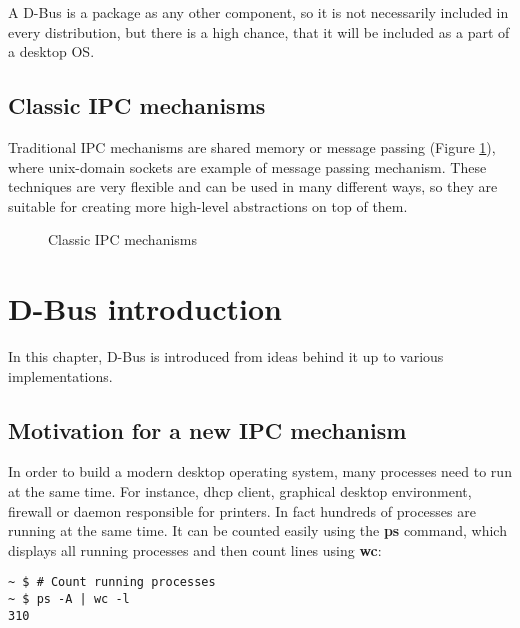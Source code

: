 \documentclass[a4paper,10.5pt]{article}
\begin{document}
A D-Bus is a package as any other component, so it is not necessarily included in every distribution, but there is a high chance, that it will be included as a part of a desktop OS.

\subsection{Classic IPC mechanisms}

Traditional IPC mechanisms are shared memory or message passing (Figure \ref{fig:ipc-classic}), where unix-domain sockets are example of message passing mechanism. These techniques are very flexible and can be used in many different ways, so they are suitable for creating more high-level abstractions on top of them.

\begin{figure}[h!]
  \begin{center}
    \caption{Classic IPC mechanisms}
    \label{fig:ipc-classic}
  \end{center}
\end{figure}

\section{D-Bus introduction}

In this chapter, D-Bus is introduced from ideas behind it up to various implementations.

\subsection{Motivation for a new IPC mechanism}

In order to build a modern desktop operating system, many processes need to run at the same time. For instance, dhcp client, graphical desktop environment, firewall or daemon responsible for printers. In fact hundreds of processes are running at the same time. It can be counted easily using the \textbf{ps} command, which displays all running processes and then count lines using \textbf{wc}:
\begin{verbatim}
~ $ # Count running processes
~ $ ps -A | wc -l
310
\end{verbatim}
\end{document}
